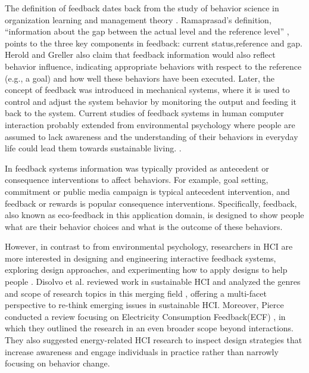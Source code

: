 \documentclass[12pt,oneside]{book}
\begin{document}
The definition of feedback dates back from the study of behavior science in organization learning and management theory \cite{Ramaprasad_1983,ASHFORD_1983,herold_feedback:_1977}.  Ramaprasad's definition, ``information about the gap between the actual level and the reference level'' \cite{Ramaprasad_1983}, points to the three key components in feedback: current status,reference and gap.  Herold and Greller \cite{herold_feedback:_1977} also claim that feedback information would also reflect behavior influence, indicating appropriate behaviors with respect to the reference (e.g., a goal) and how well these behaviors have been executed. Later, the concept of feedback was introduced in mechanical systems, where it is used to control and adjust the system behavior by monitoring the output and feeding it back to the system.  Current studies of feedback systems in human computer interaction probably extended from environmental psychology where people are assumed to lack awareness and the understanding of their behaviors in everyday life could lead them towards sustainable living. \cite{froehlich_design_2010}. 

In feedback systems information was typically provided as antecedent or consequence interventions to affect behaviors\cite{abrahamse_review_2005}.  For example, goal setting, commitment or public media campaign is typical antecedent intervention, and feedback or rewards is popular consequence interventions.  Specifically, feedback, also known as eco-feedback in this application domain, is designed to show people what are their behavior choices and what is the outcome of these behaviors.

However, in contrast to from environmental psychology, researchers in HCI are more interested in designing and engineering interactive feedback systems, exploring design approaches, and experimenting how to apply designs to help people \cite{disalvo_mapping_2010, pierce_beyond_2012, bartram_design_2015, froehlich_design_2010, silberman_toward_2010, strengers_designing_2011}. Disolvo et al. reviewed work in sustainable HCI and analyzed the genres and scope of research topics in this merging field \cite{disalvo_mapping_2010}, offering a multi-facet perspective to re-think emerging issues in sustainable HCI.  Moreover, Pierce conducted a review focusing on Electricity Consumption Feedback(ECF) \cite{pierce_beyond_2012}, in which they outlined the research in an even broader scope beyond interactions.  They also suggested energy-related HCI research to inspect design strategies that increase awareness and engage individuals in practice rather than narrowly focusing on behavior change. 
\end{document}
